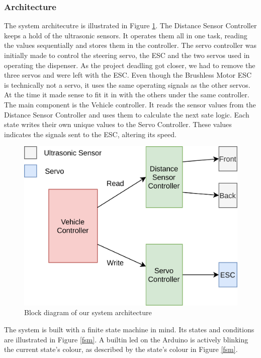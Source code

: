 \documentclass{article}
\begin{document}
\subsubsection{Architecture}
The system architecutre is illustrated in Figure \ref{SystemArchBlock}. The Distance Sensor Controller keeps a hold of the ultrasonic sensors. It operates them all in one task, reading the values sequentially and stores them in the controller. The servo controller was initially made to control the steering servo, the ESC and the two servos used in operating the dispenser. As the project deadling got closer, we had to remove the three servos and were left with the ESC. Even though the Brushless Motor ESC is technically not a servo, it uses the same operating signals as the other servos. At the time it made sense to fit it in with the others under the same controller.\\

The main component is the Vehicle controller. It reads the sensor values from the Distance Sensor Controller and uses them to calculate the next sate logic. Each state writes their own unique values to the Servo Controller. These values indicates the signals sent to the ESC, altering its speed.

\begin{figure}[H]
	\centering
	\includegraphics[width=\linewidth]{system-architecture.png}
	\caption{Block diagram of our system architecture}
	\label{SystemArchBlock}
\end{figure}

The system is built with a finite state machine in mind. Its states and conditions are illustrated in Figure \ref{fsm}. A builtin led on the Arduino is actively blinking the current state's colour, as described by the state's colour in Figure \ref{fsm}.
\end{document}
